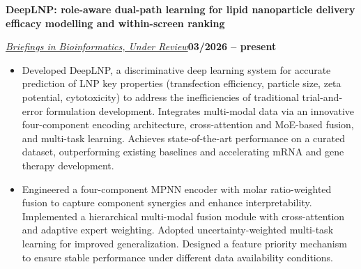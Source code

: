 \documentclass[10pt,a4paper]{article}
\newcommand{\titleline}[1]{\par\noindent\textbf{#1}\par}
\newcommand{\venueline}[2]{\par\noindent\uline{\textit{#1}}\hfill\textbf{#2}\par}
\newenvironment{cvitems}{%
  \begin{itemize}[leftmargin=14.20bp,labelwidth=4.20bp,labelsep=10.00bp,align=left,
    topsep=0bp,itemsep=0bp,parsep=0bp,partopsep=0bp,label={\textbullet}]
}{\end{itemize}}
\begin{document}
\titleline{DeepLNP: role-aware dual-path learning for lipid nanoparticle delivery efficacy modelling and within-screen ranking}
\venueline{Briefings in Bioinformatics, Under Review}{03/2026 -- present}
\begin{cvitems}
\item Developed DeepLNP, a discriminative deep learning system for accurate prediction of LNP key properties (transfection efficiency, particle size, zeta potential, cytotoxicity) to address the inefficiencies of traditional trial-and-error formulation development. Integrates multi-modal data via an innovative four-component encoding architecture, cross-attention and MoE-based fusion, and multi-task learning. Achieves state-of-the-art performance on a curated dataset, outperforming existing baselines and accelerating mRNA and gene therapy development.
\item Engineered a four-component MPNN encoder with molar ratio-weighted fusion to capture component synergies and enhance interpretability. Implemented a hierarchical multi-modal fusion module with cross-attention and adaptive expert weighting. Adopted uncertainty-weighted multi-task learning for improved generalization. Designed a feature priority mechanism to ensure stable performance under different data availability conditions.
\end{cvitems}
\end{document}
